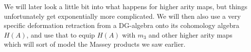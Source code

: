 We will later look a little bit into what happens for higher arity maps, but things unfortunately get exponentially more complicated. We will then also use a very specific deformation retraction from a DG-algebra onto its cohomology algebra $H(A)$, and use that to equip $H(A)$ with $m_3$ and other higher arity maps which will sort of model the Massey products we saw earlier.  
